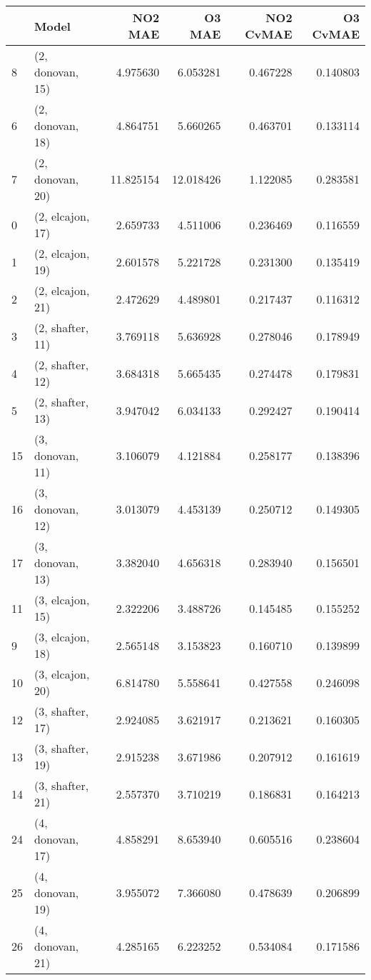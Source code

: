 \begin{tabular}{llrrrr}
\toprule
{} &             Model &    NO2 MAE &     O3 MAE &  NO2 CvMAE &  O3 CvMAE \\
\midrule
8  &  (2, donovan, 15) &   4.975630 &   6.053281 &   0.467228 &  0.140803 \\
6  &  (2, donovan, 18) &   4.864751 &   5.660265 &   0.463701 &  0.133114 \\
7  &  (2, donovan, 20) &  11.825154 &  12.018426 &   1.122085 &  0.283581 \\
0  &  (2, elcajon, 17) &   2.659733 &   4.511006 &   0.236469 &  0.116559 \\
1  &  (2, elcajon, 19) &   2.601578 &   5.221728 &   0.231300 &  0.135419 \\
2  &  (2, elcajon, 21) &   2.472629 &   4.489801 &   0.217437 &  0.116312 \\
3  &  (2, shafter, 11) &   3.769118 &   5.636928 &   0.278046 &  0.178949 \\
4  &  (2, shafter, 12) &   3.684318 &   5.665435 &   0.274478 &  0.179831 \\
5  &  (2, shafter, 13) &   3.947042 &   6.034133 &   0.292427 &  0.190414 \\
15 &  (3, donovan, 11) &   3.106079 &   4.121884 &   0.258177 &  0.138396 \\
16 &  (3, donovan, 12) &   3.013079 &   4.453139 &   0.250712 &  0.149305 \\
17 &  (3, donovan, 13) &   3.382040 &   4.656318 &   0.283940 &  0.156501 \\
11 &  (3, elcajon, 15) &   2.322206 &   3.488726 &   0.145485 &  0.155252 \\
9  &  (3, elcajon, 18) &   2.565148 &   3.153823 &   0.160710 &  0.139899 \\
10 &  (3, elcajon, 20) &   6.814780 &   5.558641 &   0.427558 &  0.246098 \\
12 &  (3, shafter, 17) &   2.924085 &   3.621917 &   0.213621 &  0.160305 \\
13 &  (3, shafter, 19) &   2.915238 &   3.671986 &   0.207912 &  0.161619 \\
14 &  (3, shafter, 21) &   2.557370 &   3.710219 &   0.186831 &  0.164213 \\
24 &  (4, donovan, 17) &   4.858291 &   8.653940 &   0.605516 &  0.238604 \\
25 &  (4, donovan, 19) &   3.955072 &   7.366080 &   0.478639 &  0.206899 \\
26 &  (4, donovan, 21) &   4.285165 &   6.223252 &   0.534084 &  0.171586 \\

\end{tabular}
